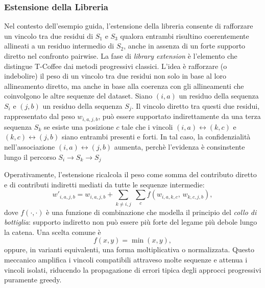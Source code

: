 \subsubsection{Estensione della Libreria}
Nel contesto dell’esempio guida, l’estensione della libreria consente di
rafforzare un vincolo tra due residui di $S_1$ e $S_3$ qualora entrambi
risultino coerentemente allineati a un residuo intermedio di $S_2$,
anche in assenza di un forte supporto diretto nel confronto pairwise.
La fase di \emph{library extension} è l'elemento che distingue T-Coffee
dai metodi progressivi classici. L'idea è rafforzare (o indebolire) il peso
di un vincolo tra due residui non solo in base al loro allineamento diretto,
ma anche in base alla coerenza con gli allineamenti che coinvolgono le altre 
sequenze del dataset.
Siano $(i,a)$ un residuo della sequenza $S_i$ e $(j,b)$ un residuo della
sequenza $S_j$. Il vincolo diretto tra questi due residui, rappresentato dal peso
$w_{i,a,j,b}$, può essere supportato indirettamente da una terza sequenza $S_k$ se esiste
una posizione $c$ tale che i vincoli $(i,a)\leftrightarrow(k,c)$ e $(k,c)\leftrightarrow(j,b)$
siano entrambi presenti e forti. In tal caso, la confidenzialità nell'associazione
$(i,a)\leftrightarrow(j,b)$ aumenta, perchè l'evidenza è consinstente 
lungo il percorso $S_i\rightarrow S_k\rightarrow S_j$

Operativamente, l'estensione ricalcola il peso come somma del contributo diretto 
e di contributi indiretti mediati da tutte le sequenze intermedie:
\[
w'_{i,a,j,b}
=
w_{i,a,j,b}
+
\sum_{k \neq i,j}\;\sum_{c}
f\!\left(w_{i,a,k,c},\, w_{k,c,j,b}\right),
\]
dove $f(\cdot,\cdot)$ è una funzione di combinazione che modella il principio
del \emph{collo di bottiglia}: supporto indiretto non può essere più forte
del legame più debole lungo la catena. Una scelta comune è 
\[
f(x,y)=\min(x,y),
\]
oppure, in varianti equivalenti, una forma moltiplicativa o normalizzata.
Questo meccanico amplifica i vincoli compatibili attraveso molte sequenze
e attenua i vincoli isolati, riducendo la propagazione di errori tipica 
degli approcci progressivi puramente greedy.

